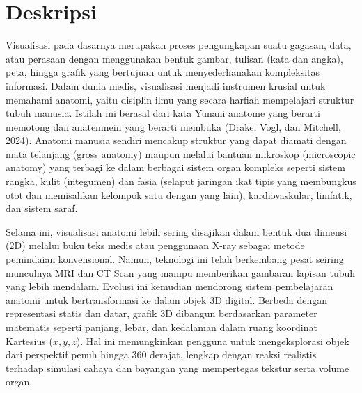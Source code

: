 \documentclass[a4paper,twoside]{article}
\begin{document}
	
	\title{\@judultopik}
	\author{\nama \textendash \@npm} 
	
	\newcommand{\nama}{Afifah Nurfauziyyah}
	\newcommand{\@npm}{6182001062}
	\newcommand{\@judultopik}{Visualisasi 3 Dimensi Anatomi Manusia} %
	\newcommand{\jumpemb}{1} %
	\newcommand{\tanggal}{18/02/2026}
	
	
	\maketitle
	
	
	\section{Deskripsi}

        Visualisasi pada dasarnya merupakan proses pengungkapan suatu gagasan, data, atau perasaan dengan menggunakan bentuk gambar, tulisan (kata dan angka), peta, hingga grafik yang bertujuan untuk menyederhanakan kompleksitas informasi. Dalam dunia medis, visualisasi menjadi instrumen krusial untuk memahami anatomi, yaitu disiplin ilmu yang secara harfiah mempelajari struktur tubuh manusia. Istilah ini berasal dari kata Yunani anatome yang berarti memotong dan anatemnein yang berarti membuka (Drake, Vogl, dan Mitchell, 2024). Anatomi manusia sendiri mencakup struktur yang dapat diamati dengan mata telanjang (gross anatomy) maupun melalui bantuan mikroskop (microscopic anatomy) yang terbagi ke dalam berbagai sistem organ kompleks seperti sistem rangka, kulit (integumen) dan fasia (selaput jaringan ikat tipis yang membungkus otot dan memisahkan kelompok satu dengan yang lain), kardiovaskular, limfatik, dan sistem saraf.
    
         Selama ini, visualisasi anatomi lebih sering disajikan dalam bentuk dua dimensi (2D) melalui buku teks medis atau penggunaan X-ray sebagai metode pemindaian konvensional. Namun, teknologi ini telah berkembang pesat seiring munculnya MRI dan CT Scan yang mampu memberikan gambaran lapisan tubuh yang lebih mendalam. Evolusi ini kemudian mendorong sistem pembelajaran anatomi untuk bertransformasi ke dalam objek 3D digital. Berbeda dengan representasi statis dan datar, grafik 3D dibangun berdasarkan parameter matematis seperti panjang, lebar, dan kedalaman dalam ruang koordinat Kartesius ($x, y, z$). Hal ini memungkinkan pengguna untuk mengeksplorasi objek dari perspektif penuh hingga 360 derajat, lengkap dengan reaksi realistis terhadap simulasi cahaya dan bayangan yang mempertegas tekstur serta volume organ.
\end{document}
